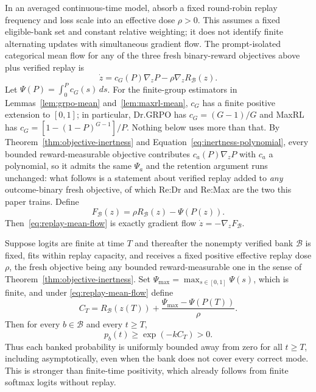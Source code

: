 In an averaged continuous-time model, absorb a fixed round-robin replay
frequency and loss scale into an effective dose $\rho>0$. This assumes a
fixed eligible-bank set and constant relative weighting; it does not identify
finite alternating updates with simultaneous gradient flow. The prompt-isolated categorical mean flow for any of the three fresh
binary-reward objectives above plus verified replay is
\begin{equation}
  \dot z
  =c_G(P)\nabla_zP-\rho\nabla_zR_{\mathcal B}(z).
  \label{eq:replay-mean-flow}
\end{equation}
Let $\Psi(P)=\int_0^P c_G(s)\,ds$. For the finite-group estimators in Lemmas~\ref{lem:grpo-mean}
and~\ref{lem:maxrl-mean}, $c_G$ has a finite positive extension to $[0,1]$;
in particular, Dr.GRPO has $c_G=(G-1)/G$ and MaxRL has
$c_G=[1-(1-P)^{G-1}]/P$. Nothing below uses more than that. By
Theorem~\ref{thm:objective-inertness} and
Equation~\eqref{eq:inertness-polynomial}, every bounded reward-measurable
objective contributes $c_a(P)\nabla_zP$ with $c_a$ a polynomial, so it admits
the same $\Psi_a$ and the retention argument runs unchanged: what follows is a
statement about verified replay added to \emph{any} outcome-binary fresh
objective, of which Re:Dr and Re:Max are the two this paper trains. Define
\begin{equation}
  F_{\mathcal B}(z)=\rho R_{\mathcal B}(z)-\Psi(P(z)).
  \label{eq:replay-potential}
\end{equation}
Then~\eqref{eq:replay-mean-flow} is exactly gradient flow
$\dot z=-\nabla_zF_{\mathcal B}$.

\begin{theorem}
\enforcehalffinalproseline
\label{thm:replay-retention}
Suppose logits are finite at time $T$ and thereafter the nonempty verified
bank $\mathcal B$ is fixed, fits within replay capacity, and receives a
fixed positive effective replay dose $\rho$, the fresh objective being any
bounded reward-measurable one in the sense of
Theorem~\ref{thm:objective-inertness}. Set
$\Psi_{\max}=\max_{s\in[0,1]}\Psi(s)$, which is finite, and under
\eqref{eq:replay-mean-flow} define
\[
  C_T
  =R_{\mathcal B}(z(T))
   +\frac{\Psi_{\max}-\Psi(P(T))}{\rho}.
\]
Then for every $b\in\mathcal B$ and every $t\ge T$,
\begin{equation}
  p_b(t)\ge \exp(-kC_T)>0.
  \label{eq:replay-retention-bound}
\end{equation}
Thus each banked probability is uniformly bounded away from zero for all
$t\ge T$, including asymptotically, even when the bank does not cover every
correct mode. This is stronger than finite-time positivity, which already
follows from finite softmax logits without replay.
\end{theorem}

